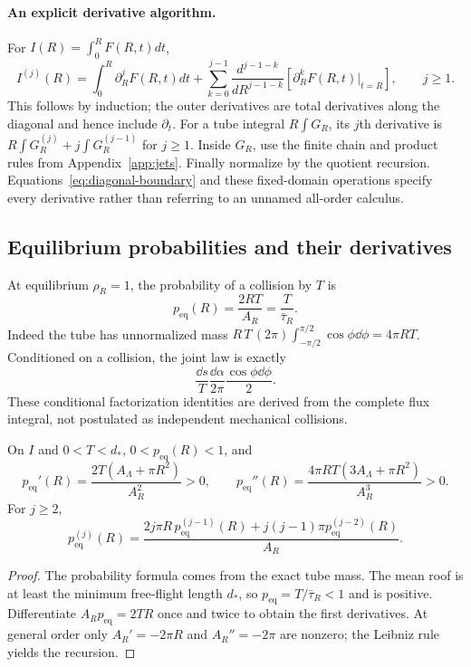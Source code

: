 \paragraph{An explicit derivative algorithm.}
For $I(R)=\int_0^R F(R,t)dt$,
\begin{equation}
 I^{(j)}(R)=\int_0^R\partial_R^jF(R,t)dt
 +\sum_{k=0}^{j-1}\frac{d^{j-1-k}}{dR^{j-1-k}}
 [\partial_R^kF(R,t)|_{t=R}],\qquad j\ge1.
 \label{eq:diagonal-boundary}
\end{equation}
This follows by induction; the outer derivatives are total derivatives along the diagonal and hence include $\partial_t$. For a tube integral $R\int G_R$, its $j$th derivative is
$R\int G_R^{(j)}+j\int G_R^{(j-1)}$ for $j\ge1$. Inside $G_R$, use the finite chain and product rules from Appendix~\ref{app:jets}. Finally normalize by the quotient recursion. Equations~\eqref{eq:diagonal-boundary} and these fixed-domain operations specify every derivative rather than referring to an unnamed all-order calculus.

\subsection{Equilibrium probabilities and their derivatives}
At equilibrium $\rho_R=1$, the probability of a collision by $T$ is
\begin{equation}
 p_{\mathrm{eq}}(R)=\frac{2RT}{A_R}=\frac{T}{\bar\tau_R}.
 \label{eq:peq}
\end{equation}
Indeed the tube has unnormalized mass
$R\,T\,(2\pi)\int_{-\pi/2}^{\pi/2}\cos\phi\dd\phi=4\pi RT$.
Conditioned on a collision, the joint law is exactly
\begin{equation}
 \frac{\dd s}{T}\frac{\dd\alpha}{2\pi}\frac{\cos\phi\dd\phi}{2}.
 \label{eq:conditional-hit}
\end{equation}
These conditional factorization identities are derived from the complete flux integral, not postulated as independent mechanical collisions.

\begin{corollary}\label{cor:global-hit}
On $I$ and $0<T<d_*$, $0<p_{\mathrm{eq}}(R)<1$, and
\[
 p_{\mathrm{eq}}'(R)=\frac{2T(A_\Lambda+\pi R^2)}{A_R^2}>0,\qquad
 p_{\mathrm{eq}}''(R)=\frac{4\pi RT(3A_\Lambda+\pi R^2)}{A_R^3}>0.
\]
For $j\ge2$,
\[
 p_{\mathrm{eq}}^{(j)}(R)
 =\frac{2j\pi R\,p_{\mathrm{eq}}^{(j-1)}(R)+j(j-1)\pi p_{\mathrm{eq}}^{(j-2)}(R)}{A_R}.
\]
\end{corollary}
\begin{proof}
The probability formula comes from the exact tube mass. The mean roof is at least the minimum free-flight length $d_*$, so $p_{\mathrm{eq}}=T/\bar\tau_R<1$ and is positive. Differentiate $A_Rp_{\mathrm{eq}}=2TR$ once and twice to obtain the first derivatives. At general order only $A_R'=-2\pi R$ and $A_R''=-2\pi$ are nonzero; the Leibniz rule yields the recursion.
\end{proof}

